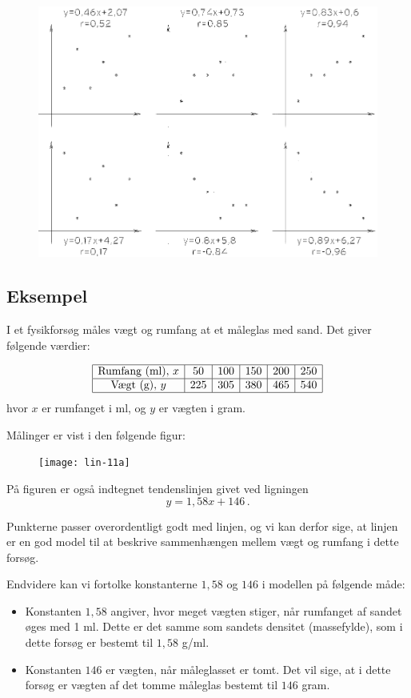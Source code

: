 \documentclass[12pt,oneside,a4paper]{article}
\begin{document}
\begin{figure}[H]
    \centering
    \includegraphics[width=\textwidth]{fig57}
\end{figure}

\subsection{Eksempel}
I et fysikforsøg måles vægt og rumfang at et måleglas med sand. Det giver følgende værdier:

\[
\begin{array}{|c|c|c|c|c|c|}
    \hline
    \mbox{Rumfang (ml)},\, x &  50 &  100 &  150 &  200 &  250  \\
    \hline
    \mbox{Vægt (g)},\, y &  225 &   305 &  380 &  465 &  540 \\
    \hline
\end{array}
\]
hvor $x$ er rumfanget i ml, og $y$ er vægten i gram.

Målinger er vist i den følgende figur:

\begin{figure}[H]
    \centering
    \texttt{[image: lin-11a]}
\end{figure}

På figuren er også indtegnet tendenslinjen givet ved ligningen
\[
    y=1,58 x + 146 \,.
\]

Punkterne passer overordentligt godt med linjen, og vi kan derfor sige, at linjen er en god model
til at beskrive sammenhængen mellem vægt og rumfang i dette forsøg.

Endvidere kan vi fortolke konstanterne $1,58$ og $146$ i modellen på følgende måde:
\begin{itemize}
    \item Konstanten $1,58$ angiver, hvor meget vægten stiger, når rumfanget af
        sandet øges med 1 ml. Dette er det samme som sandets densitet
        (massefylde), som i dette forsøg er bestemt til $1,58$ g/ml.
    \item Konstanten $146$ er vægten, når måleglasset er tomt. Det vil sige, at
        i dette forsøg er vægten af det tomme måleglas bestemt til $146$ gram.
\end{itemize}
\end{document}
